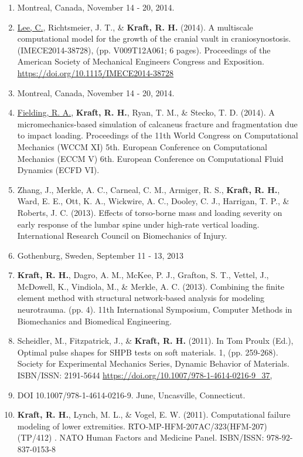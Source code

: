\documentclass[a4paper,10pt]{article}
\begin{document}
\begin{enumerate}
  \item Montreal, Canada, November 14 - 20, 2014.
  \item \underline{Lee, C.}, Richtsmeier, J. T., \&
 \textbf{\textbf{Kraft,} R. H.} (2014). A multiscale computational model for the growth of the cranial vault in craniosynostosis.(IMECE2014-38728), (pp. V009T12A061; 6 pages). Proceedings of the American Society of Mechanical Engineers Congress and Exposition. \url{https://doi.org/10.1115/IMECE2014-38728}
  \item Montreal, Canada, November 14 - 20, 2014.
  \item \underline{Fielding, R. A.}, \textbf{\textbf{Kraft,} R. H.}, Ryan, T. M., \&
 Stecko, T. D. (2014). A micromechanics-based simulation of calcaneus fracture and fragmentation due to impact loading. Proceedings of the 11th World Congress on Computational Mechanics (WCCM XI) 5th. European Conference on Computational Mechanics (ECCM V)    6th. European Conference on Computational Fluid Dynamics (ECFD VI).
  \item Zhang, J., Merkle, A. C., Carneal, C. M., Armiger, R. S., \textbf{\textbf{Kraft,} R. H.}, Ward, E. E., Ott, K. A., Wickwire, A. C., Dooley, C. J., Harrigan, T. P., \&
 Roberts, J. C. (2013). Effects of torso-borne mass and loading severity on early response of the lumbar spine under high-rate vertical loading. International Research Council on Biomechanics of Injury.
  \item Gothenburg, Sweden, September 11 - 13,    2013
  \item \textbf{\textbf{Kraft,} R. H.}, Dagro, A. M., McKee, P. J., Grafton, S. T., Vettel, J., McDowell, K., Vindiola, M., \&
 Merkle, A. C. (2013). Combining the finite element method with structural network-based analysis for modeling neurotrauma. (pp. 4). 11th International Symposium, Computer Methods in Biomechanics and Biomedical Engineering.
  \item Scheidler, M., Fitzpatrick, J., \&
 \textbf{\textbf{Kraft,} R. H.} (2011). In Tom Proulx (Ed.), Optimal pulse shapes for SHPB tests on soft materials. 1, (pp. 259-268). Society for Experimental Mechanics Series, Dynamic Behavior of Materials.  ISBN/ISSN: 2191-5644 \url{https://doi.org/10.1007/978-1-4614-0216-9_37,}
  \item DOI 10.1007/978-1-4614-0216-9. June, Uncasville, Connecticut.
  \item \textbf{\textbf{Kraft,} R. H.}, Lynch, M. L., \&
 Vogel, E. W. (2011). Computational failure modeling of lower extremities. RTO-MP-HFM-207AC/323(HFM-207)(TP/412) . NATO Human Factors and Medicine Panel. ISBN/ISSN: 978-92-837-0153-8

\end{enumerate}
\end{document}
